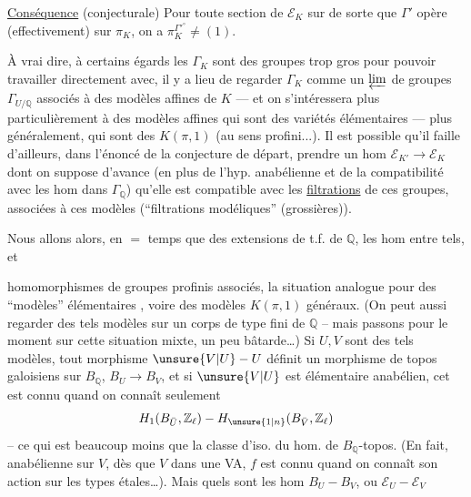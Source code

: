 \uline{Conséquence} (conjecturale) Pour toute  section de $\mathcal E_K$ sur   de sorte que $\Gamma'$ opère (effectivement) sur $\pi_K$, on a  $\pi_K^{\Gamma'^\circ}\ne(1)$.

À vrai dire, à certains égards les $\Gamma_K$ sont des groupes trop gros pour pouvoir travailler directement avec, il y a lieu de regarder $\Gamma_K$ comme un $\varprojlim$ de groupes $\Gamma_{U/\mathbb Q}$ associés à des modèles affines de $K$ --- et on s'intéressera plus particulièrement à des modèles affines qui sont des variétés élémentaires --- plus généralement, qui sont des $K(\pi,1)$ (au sens profini...). Il est possible qu'il faille d'ailleurs, dans l'énoncé de la conjecture de départ, prendre un hom  $\mathcal E_{K'}\longrightarrow\mathcal E_K$ dont on suppose d'avance (en plus de l'hyp. anabélienne et de la compatibilité avec les hom dans $\Gamma_{\mathbb Q}$) qu'elle est compatible avec les \uline{filtrations} de ces groupes, associées à ces modèles (``filtrations modéliques'' (grossières)).

Nous allons alors, en $=$ temps que des extensions de t.f. de $\mathbb Q$, les hom entre tels, et

homomorphismes de groupes profinis associés,   la situation analogue pour des ``modèles'' élémentaires , voire des modèles $K(\pi,1)$ généraux. (On peut aussi regarder des tels modèles sur un corps   de type fini de $\mathbb Q$ -- mais passons pour le moment sur cette situation mixte, un peu bâtarde\ldots) Si $U,V$ sont des tels modèles, tout morphisme $\unsure{V|U}-U$ définit un morphisme de topos galoisiens sur $B_{\mathbb Q}$, $B_U\longrightarrow B_V$,  et si $\unsure{V|U}$ est  élémentaire anabélien, cet  est connu quand on connaît seulement
\[
H_1(B_{\bar U},\mathbb Z_{\ell})-H_{\unsure{1|n}}(B_{\bar V},\mathbb Z_{\ell})
\]
-- ce qui est beaucoup moins que la classe d'iso. du hom. de $B_{\mathbb Q}$-topos. (En fait,   anabélienne sur $V$, dès que $V$  dans une VA, $f$ est connu quand on connaît son action sur les types étales\ldots). Mais quels sont les hom $B_U-B_V$, ou $\mathcal E_U-\mathcal E_V$

